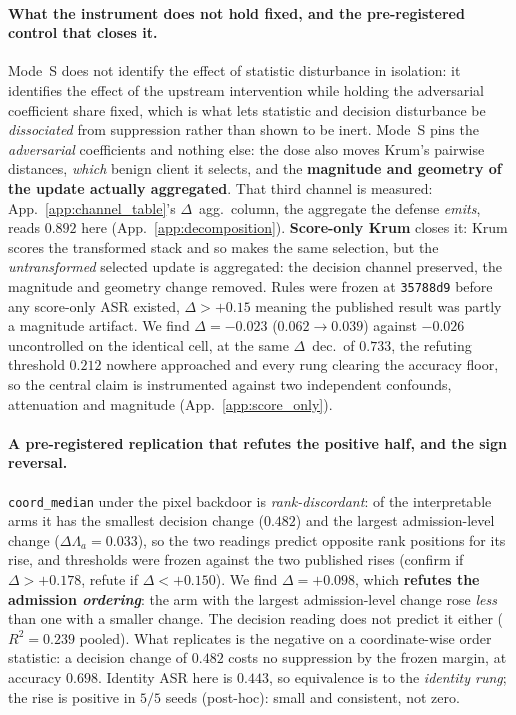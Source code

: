 \documentclass{article}
\begin{document}
\paragraph{What the instrument does not hold fixed, and the pre-registered control that closes it.} Mode~S does not identify the effect of statistic disturbance in isolation: it identifies the effect of the upstream intervention while holding the adversarial coefficient share fixed, which is what lets statistic and decision disturbance be \emph{dissociated} from suppression rather than shown to be inert. Mode~S pins the \emph{adversarial} coefficients and nothing else: the dose also moves Krum's pairwise distances, \emph{which} benign client it selects, and the \textbf{magnitude and geometry of the update actually aggregated}. That third channel is measured: App.~\ref{app:channel_table}'s $\Delta$~agg.\ column, the aggregate the defense \emph{emits}, reads $\mathbf{0.892}$ here (App.~\ref{app:decomposition}). \textbf{Score-only Krum} closes it: Krum scores the transformed stack and so makes the same selection, but the \emph{untransformed} selected update is aggregated: the decision channel preserved, the magnitude and geometry change removed. Rules were frozen at \texttt{35788d9} before any score-only ASR existed, $\Delta > +0.15$ meaning the published result was partly a magnitude artifact. We find $\Delta = -0.023$ ($0.062 \to 0.039$) against $-0.026$ uncontrolled on the identical cell, at the same $\Delta$~dec.\ of $0.733$, the refuting threshold $0.212$ nowhere approached and every rung clearing the accuracy floor, so the central claim is instrumented against two independent confounds, attenuation and magnitude (App.~\ref{app:score_only}).

\paragraph{A pre-registered replication that refutes the positive half, and the sign reversal.} \texttt{coord\_median} under the pixel backdoor is \emph{rank-discordant}: of the interpretable arms it has the smallest decision change ($0.482$) and the largest admission-level change ($\Delta\Lambda_a{=}0.033$), so the two readings predict opposite rank positions for its rise, and thresholds were frozen against the two published rises (confirm if $\Delta>+0.178$, refute if $\Delta<+0.150$). We find $\Delta=+0.098$, which \textbf{refutes the admission \emph{ordering}}: the arm with the largest admission-level change rose \emph{less} than one with a smaller change. The decision reading does not predict it either ($R^2{=}0.239$ pooled). What replicates is the negative on a coordinate-wise order statistic: a decision change of $0.482$ costs no suppression by the frozen margin, at accuracy $0.698$. Identity ASR here is $0.443$, so equivalence is to the \emph{identity rung}; the rise is positive in $5/5$ seeds (post-hoc): small and consistent, not zero.
\end{document}
